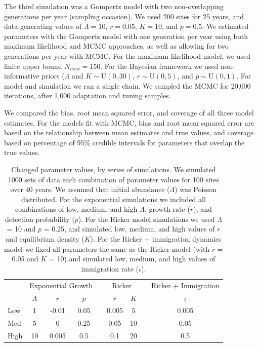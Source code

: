 \documentclass{article}
\begin{document}
The third simulation was a Gompertz model with two non-overlapping generations per year (sampling occasion).   
We used 200 sites for 25 years, and data-generating values of $\Lambda = 10$, $r = 0.05$, $K = 10$, and $p = 0.5$.
We estimated parameters with the Gompertz model with 
one generation per year using both maximum likelihood and MCMC approaches, as well
as allowing for two generations per year with MCMC.  
For the maximum likelihood model, we used finite upper bound $N_{max} = 150$. 
For the Bayesian framework we used non-informative priors ($\Lambda$ and $K  \sim \mathrm{U}(0, 30)$, $r  \sim \mathrm{U}(0, 5)$,
and $p  \sim \mathrm{U}(0, 1)$.  
For model and simulation we ran a single chain. We sampled the MCMC for 20,000 iterations, after 1,000 adaptation and tuning samples.  

We compared the bias, root mean
squared error, and coverage of all three model estimates.  For the models fit with MCMC,
bias and root mean squared error are based on the relationship between mean estimates
and true values, and coverage
based on percentage of 95\% credible intervals for parameters that overlap the true values.
\newpage

\begin{table}[t]
  \centering
\caption{Changed parameter values, by series of simulations.  We
simulated 1000 sets of data each combination of parameter values
for 100 sites over 40 years.  We assumed that initial abundance
($\Lambda$) was Poisson distributed.  For the exponential 
simulations we included all combinations of low, medium, and
high $\Lambda$, growth rate ($r$), and detection probability ($p$).
For the Ricker model simulations we used $\Lambda$ = 10 and $p$ = 0.25, and
simulated low, medium, and high values of $r$ and equilibrium density ($K$).
For the Ricker + immigration dynamics model we fixed all parameters the
same as the Ricker model (with $r$ = 0.05 and $K$ = 10) and
simulated low, medium, and high values of immigration rate ($\iota$).}  
\begin{tabular}{lcccccccc}
    \hline
    & \multicolumn{3}{c}{Exponential Growth} && \multicolumn{2}{c}{Ricker} &&
    Ricker + Immigration \\
    \cline{2-4}     \cline{6-7}    \cline{9-9}
& $\Lambda$ & $r$ & $p$ && $r$  & $K$ && $\iota$  \\    
\hline
    Low	        &1	&-0.01	&0.05	&&0.005	 &5	&&0.005  \\
    Med	        &5	&0	&0.25	&&0.05	&10	&&0.05   \\
    High		 &10 &0.005	&0.5	&&0.1	&20	&&0.5    \\
    \hline
  \end{tabular}
\end{table}
\end{document}
